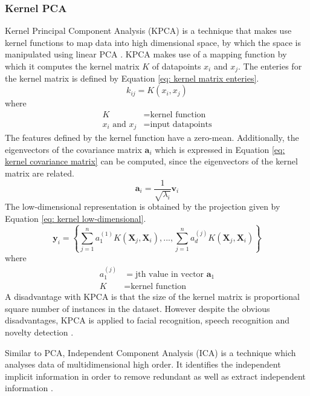 \documentclass[11pt,twocolumn]{witseiepaper}
\begin{document}
	\subsubsection{Kernel PCA}
	Kernel Principal Component Analysis (KPCA) is a technique that makes use kernel functions to map data into high dimensional space, by which the space is manipulated using linear PCA \cite{Cui2012}. KPCA makes use of a mapping function by which it computes the kernel matrix $K$ of datapoints $x_i$ and $x_j$. The enteries for the kernel matrix is defined by Equation \ref{eq: kernel matrix enteries}.
	\begin{equation}
		k_{ij} = K(x_i, x_j)
		\label{eq: kernel matrix enteries}
	\end{equation}
	where
	\begin{align*}
		K &= \text{kernel function}\\
		x_i \text{ and } x_j &= \text{input datapoints}
	\end{align*}
	The features defined by the kernel function have a zero-mean. Additionally, the eigenvectors of the covariance matrix $\textbf{a}_i$ which is expressed in Equation \ref{eq: kernel covariance matrix} can be computed, since the eigenvectors of the kernel matrix are related.
	\begin{equation}
		\textbf{a}_i = \frac{1}{\sqrt{\lambda_i}} \textbf{v}_i
		\label{eq: kernel covariance matrix}
	\end{equation}
	The low-dimensional representation is obtained by the projection given by Equation \ref{eq: kernel low-dimensional}.
	\begin{equation}
		\textbf{y}_i = \left\{ \sum_{j = 1}^{n}a_1^{(1)}K(\textbf{X}_j, \textbf{X}_i), ... , \sum_{j = 1}^{n}a_d^{(j)}K(\textbf{X}_j, \textbf{X}_i) \right\}
		\label{eq: kernel low-dimensional}
	\end{equation}
	where
	\begin{align*}
		a_1^{(j)} &= \text{jth value in vector }\textbf{a}_1\\
		K &= \text{kernel function}
	\end{align*}
	A disadvantage with KPCA is that the size of the kernel matrix is proportional square number of instances in the dataset. However despite the obvious disadvantages, KPCA is applied to facial recognition, speech recognition and novelty detection \cite{van2009dimensionality}.
	
	Similar to PCA, Independent Component Analysis (ICA) is a technique which analyses data of multidimensional high order. It identifies the independent implicit information in order to remove redundant as well as extract independent information \cite{7852869}.
	
\end{document}
